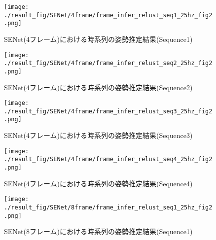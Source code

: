 \begin{figure}[thpb]
  \begin{minipage}[htpb]{1.0\hsize}
  \begin{center}
  \texttt{[image: ./result\_fig/SENet/4frame/frame\_infer\_relust\_seq1\_25hz\_fig2.png]}
  \caption{SENet(4フレーム)における時系列の姿勢推定結果(Sequence1)}
  \end{center}
  \end{minipage}
\end{figure}

\begin{figure}[thpb]
  \begin{minipage}[htpb]{1.0\hsize}
  \begin{center}
  \texttt{[image: ./result\_fig/SENet/4frame/frame\_infer\_relust\_seq2\_25hz\_fig2.png]}
  \caption{SENet(4フレーム)における時系列の姿勢推定結果(Sequence2)}
  \end{center}
  \end{minipage}
\end{figure}

\begin{figure}[thpb]
  \begin{minipage}[htpb]{1.0\hsize}
  \begin{center}
  \texttt{[image: ./result\_fig/SENet/4frame/frame\_infer\_relust\_seq3\_25hz\_fig2.png]}
  \caption{SENet(4フレーム)における時系列の姿勢推定結果(Sequence3)}
  \end{center}
  \end{minipage}
\end{figure}

\begin{figure}[thpb]
  \begin{minipage}[htpb]{1.0\hsize}
  \begin{center}
  \texttt{[image: ./result\_fig/SENet/4frame/frame\_infer\_relust\_seq4\_25hz\_fig2.png]}
  \caption{SENet(4フレーム)における時系列の姿勢推定結果(Sequence4)}
  \end{center}
  \end{minipage}
\end{figure}


\begin{figure}[thpb]
  \begin{minipage}[htpb]{1.0\hsize}
  \begin{center}
  \texttt{[image: ./result\_fig/SENet/8frame/frame\_infer\_relust\_seq1\_25hz\_fig2.png]}
  \caption{SENet(8フレーム)における時系列の姿勢推定結果(Sequence1)}
  \end{center}
  \end{minipage}
\end{figure}

